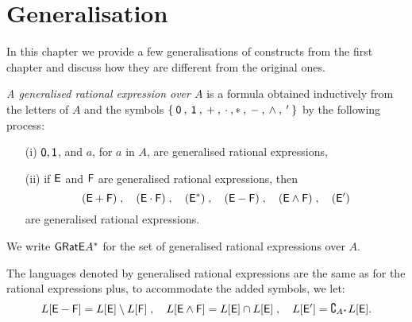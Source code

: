 \chapter{Generalisation}

In this chapter we provide a few generalisations of constructs from the first chapter and discuss how they are different from the original ones.

\begin{defn}
    \emph{A generalised rational expression over $A$} is a formula obtained inductively from the letters of $A$ and the symbols $\{ \: {\mathsf{0}} \: , \: {\mathsf{1}} \: , \: + \: , \: \cdot \: , * \: , \: - \: , \: \wedge \: , \: ^{\prime} \: \}$ by the following process:
    \begin{itemize}
        \item[(i)] ${\mathsf{0}}, {\mathsf{1}}$, and $a$, for $a$ in $A$, are generalised rational expressions,
        \item[(ii)] if ${\mathsf{E}}$ and ${\mathsf{F}}$ are generalised rational expressions, then
            \[
                ({\mathsf{E}} + {\mathsf{F}}) \; , \quad ({\mathsf{E}} \cdot {\mathsf{F}}) \; , \quad ({\mathsf{E}}^*) \; , \quad ({\mathsf{E}} - {\mathsf{F}}) \; , \quad ({\mathsf{E}} \wedge {\mathsf{F}}) \; , \quad ({\mathsf{E}}^{\prime})
            \]
             are generalised rational expressions.
    \end{itemize}
    We write ${\mathsf{GRatE}} A^*$ for the set of generalised rational expressions over $A$.
\end{defn}

The languages denoted by generalised rational expressions are the same as for the rational expressions plus, to accommodate the added symbols, we let:
\[
    L[{\mathsf{E}} - {\mathsf{F}}] = L[{\mathsf{E}}] \setminus L[{\mathsf{F}}] \; , \quad L[{\mathsf{E}} \wedge {\mathsf{F}}] = L[{\mathsf{E}}] \cap L[{\mathsf{E}}] \; , \quad L[{\mathsf{E}}^{\prime}] = \complement_{A^*} L[{\mathsf{E}}].
\]

